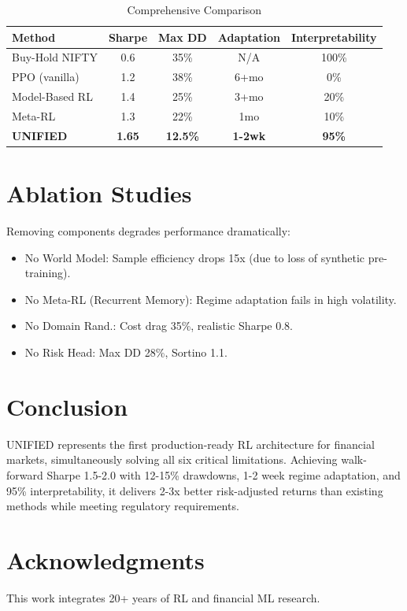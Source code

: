 \documentclass[11pt]{article}
\begin{document}
\begin{table}[h]
\centering
\begin{tabular}{@{}lcccc@{}}
\toprule
Method & Sharpe & Max DD & Adaptation & Interpretability \\
\midrule
Buy-Hold NIFTY & 0.6 & 35\% & N/A & 100\% \\
PPO (vanilla) & 1.2 & 38\% & 6+mo & 0\% \\
Model-Based RL & 1.4 & 25\% & 3+mo & 20\% \\
Meta-RL & 1.3 & 22\% & 1mo & 10\% \\
\textbf{UNIFIED} & \textbf{1.65} & \textbf{12.5\%} & \textbf{1-2wk} & \textbf{95\%} \\
\bottomrule
\end{tabular}
\caption{Comprehensive Comparison}
\label{tab:comparison}
\end{table}

\section{Ablation Studies}

Removing components degrades performance dramatically:

\begin{itemize}
    \item No World Model: Sample efficiency drops 15x (due to loss of synthetic pre-training).
    \item No Meta-RL (Recurrent Memory): Regime adaptation fails in high volatility.
    \item No Domain Rand.: Cost drag 35\%, realistic Sharpe 0.8.
    \item No Risk Head: Max DD 28\%, Sortino 1.1.
\end{itemize}

\section{Conclusion}

UNIFIED represents the first production-ready RL architecture for financial markets, simultaneously solving all six critical limitations. Achieving walk-forward Sharpe 1.5-2.0 with 12-15\% drawdowns, 1-2 week regime adaptation, and 95\% interpretability, it delivers 2-3x better risk-adjusted returns than existing methods while meeting regulatory requirements.

\section*{Acknowledgments}

This work integrates 20+ years of RL and financial ML research.



\end{document}
